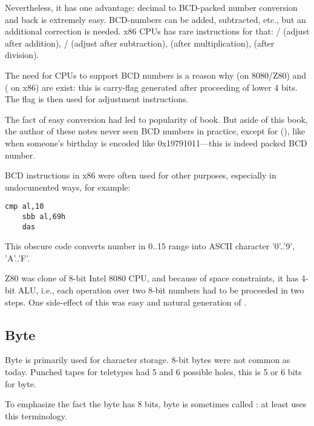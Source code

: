 Nevertheless, it has one advantage: decimal to \ac{BCD}-packed number conversion and back is extremely easy.
BCD-numbers can be added, subtracted, etc., but an additional correction is needed.
x86 CPUs has rare instructions for that:
/ (adjust after addition),
/ (adjust after subtraction),
 (after multiplication),
 (after division).

The need for CPUs to support \ac{BCD} numbers is a reason why  (on 8080/Z80) and
 ( on x86)
are exist: this is carry-flag generated after proceeding of lower 4 bits. The flag is then used for adjustment instructions.

The fact of easy conversion had led to popularity of
 book.
But aside of this book, the author of these notes never seen \ac{BCD} numbers in practice, except for
 (),
like when someone's birthday is encoded like 0x19791011---this is indeed packed \ac{BCD} number.

\ac{BCD} instructions in x86 were often used for other purposes, especially in undocumented ways, for example:

\begin{lstlisting}[style=customasmx86]
	cmp al,10
	sbb al,69h
	das
\end{lstlisting}

This obscure code converts number in 0..15 range into \ac{ASCII} character '0'..'9', 'A'..'F'.


Z80 was clone of 8-bit Intel 8080 CPU, and because of space constraints, it has 4-bit \ac{ALU}, i.e., each operation
over two 8-bit numbers had to be proceeded in two steps.
One side-effect of this was easy and natural generation of .

\subsection{Byte}

Byte is primarily used for character storage.
8-bit bytes were not common as today.
Punched tapes for teletypes had 5 and 6 possible holes, this is 5 or 6 bits for byte.

To emphasize the fact the byte has 8 bits, byte is sometimes called :
at least  uses this terminology.

